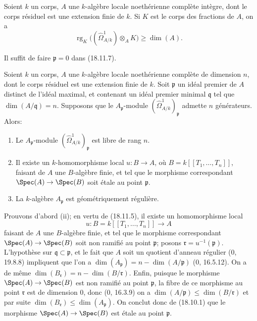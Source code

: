 
\begin{corollary}[18.11.8]
\label{IV.18.11.8}
Soient $k$ un corps, $A$ une $k$-algèbre locale noethérienne complète intègre, dont le corps résiduel est une extension finie de $k$. Si $K$ est le corps des fractions de $A$, on a
\[
  \operatorname{rg}_K\bigl((\hat{\Omega}^1_{A/k})\otimes_A K\bigr)\geq\dim(A).
\]
\end{corollary}

Il suffit de faire $\mathfrak p=0$ dans (18.11.7).

\begin{corollary}[18.11.9]
\label{IV.18.11.9}
Soient $k$ un corps, $A$ une $k$-algèbre locale noethérienne complète de dimension $n$, dont le corps résiduel est une extension finie de $k$. Soit $\mathfrak p$ un idéal premier de $A$ distinct de l'idéal maximal, et contenant un idéal premier minimal $\mathfrak q$ tel que $\dim(A/\mathfrak q)=n$. Supposons que le $A_{\mathfrak p}$-module $(\hat{\Omega}^1_{A/k})_{\mathfrak p}$ admette $n$ générateurs. Alors:
\begin{enumerate}
  \item[(i)] Le $A_{\mathfrak p}$-module $(\hat{\Omega}^1_{A/k})_{\mathfrak p}$ est libre de rang $n$.
  \item[(ii)] Il existe un $k$-homomorphisme local $u:B\to A$, où $B=k[[T_1,\ldots,T_n]]$, faisant de $A$ une $B$-algèbre finie, et tel que le morphisme correspondant $\Spec(A)\to\Spec(B)$ soit étale au point $\mathfrak p$.
  \item[(iii)] La $k$-algèbre $A_{\mathfrak p}$ est géométriquement régulière.
\end{enumerate}
\end{corollary}

Prouvons d'abord (ii); en vertu de (18.11.5), il existe un homomorphisme local
\[
  u:B=k[[T_1,\ldots,T_n]]\longrightarrow A
\]
faisant de $A$ une $B$-algèbre finie, et tel que le morphisme correspondant $\Spec(A)\to\Spec(B)$ soit non ramifié au point $\mathfrak p$; posons $\mathfrak r=u^{-1}(\mathfrak p)$. L'hypothèse sur $\mathfrak q\subset\mathfrak p$, et le fait que $A$ soit un quotient d'anneau régulier (0, 19.8.8) impliquent que l'on a $\dim(A_{\mathfrak p})=n-\dim(A/\mathfrak p)$ (0, 16.5.12). On a de même $\dim(B_{\mathfrak r})=n-\dim(B/\mathfrak r)$. Enfin, puisque le morphisme $\Spec(A)\to\Spec(B)$ est non ramifié au point $\mathfrak p$, la fibre de ce morphisme au point $\mathfrak r$ est de dimension 0, donc (0, 16.3.9) on a $\dim(A/\mathfrak p)\leq\dim(B/\mathfrak r)$ et par suite $\dim(B_{\mathfrak r})\leq\dim(A_{\mathfrak p})$. On conclut donc de (18.10.1) que le morphisme $\Spec(A)\to\Spec(B)$ est étale au point $\mathfrak p$.

